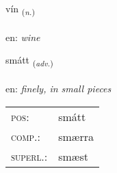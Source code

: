 \documentclass[frontgrid, backgrid]{flacards}\usepackage[]{graphicx}\usepackage[]{color}
\begin{document}
\renewcommand{\flhead}{\vskip5pt \fboxsep=0pt {\small\bfseries\footnotesize Nafnorð | Noun}}
\renewcommand{\fcfoot}{\vskip5pt \fboxsep=0pt \hspace{2pt}{\small\bfseries\footnotesize 2K}}

\renewcommand{\blhead}{\vskip5pt {\small\bfseries\footnotesize Nafnorð | Noun }}
\renewcommand{\bcfoot}{\vskip5pt \hspace{2pt}{\small\bfseries\footnotesize 2K}}


{vín \small{\textsubscript{(\textit{n.})}} \\[1ex] %
\textphonetic{[viːn]} \\
en: \emph{wine} \\  [2ex]
\renewcommand*{\arraystretch}{0.8}
}

\renewcommand{\flhead}{\vskip5pt \fboxsep=0pt {\small\bfseries\footnotesize Atviksorð | Adverb}}
\renewcommand{\fcfoot}{\vskip5pt \fboxsep=0pt \hspace{2pt}{\small\bfseries\footnotesize 2K}}

\renewcommand{\blhead}{\vskip5pt {\small\bfseries\footnotesize Atviksorð | Adverb }}
\renewcommand{\bcfoot}{\vskip5pt \hspace{2pt}{\small\bfseries\footnotesize 2K}}


{smátt \small{\textsubscript{(\textit{adv.})}} \\[1ex] %
\textphonetic{[smauht]} \\
en: \emph{finely, in small pieces} \\  [2ex]
\renewcommand*{\arraystretch}{0.8}
\begin{tabular}{ll}
\textsc{pos}: & smátt \\ 
\textsc{comp.}: & smærra \\ 
\textsc{superl.}: & smæst \\
\end{tabular}
}
\end{document}
